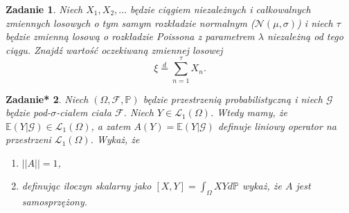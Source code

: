 \documentclass{mwart}
\newtheorem{zd}{Zadanie}
\newtheorem{zdt}[zd]{Zadanie*}
\begin{document}
\begin{zd}
	Niech $X_1, X_2, \dots $ będzie ciągiem niezależnych i całkowalnych zmiennych losowych o tym samym rozkładzie normalnym ($\mathcal{N}(\mu,\sigma)$) i niech $\tau$ będzie zmienną losową o rozkładzie Poissona z parametrem $\lambda$ niezależną od tego ciągu. Znajdź wartość oczekiwaną zmiennej losowej
	\begin{displaymath}
	\xi \stackrel{d}{=} \sum_{n=1}^\tau X_n.
	\end{displaymath}
\end{zd}

\begin{zdt}
Niech $\left(\Omega, \mathcal{F}, \mathbb{P}\right)$ będzie przestrzenią probabilistyczną i niech $\mathcal{G}$ będzie pod-$\sigma$-ciałem ciała $\mathcal{F}$. Niech $Y\in \mathcal{L}_1\left(\Omega\right)$. Wtedy mamy, że $\mathbb{E}\left(Y|\mathcal{G}\right) \in \mathcal{L}_1\left(\Omega\right)$, a zatem $A(Y) = \mathbb{E}\left(Y|\mathcal{G}\right)$ definuje liniowy operator na przestrzeni $\mathcal{L}_1\left(\Omega\right)$. Wykaż, że
\begin{enumerate}
\item $||A|| = 1$,
\item definując iloczyn skalarny jako $[X, Y] = \int_{\Omega}XYd\mathbb{P}$ wykaż, że $A$ jest samosprzężony.
\end{enumerate}
\end{zdt}
\end{document}
